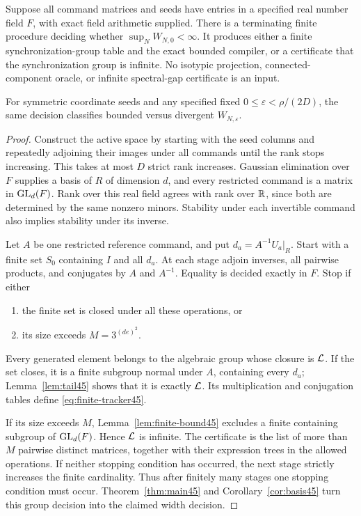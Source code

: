 \begin{theorem}\label{thm:decision45}
Suppose all command matrices and seeds have entries in a specified real number field $F$, with exact field arithmetic supplied. There is a terminating finite procedure deciding whether $\sup_NW_{N,0}<\infty$. It produces either a finite synchronization-group table and the exact bounded compiler, or a certificate that the synchronization group is infinite. No isotypic projection, connected-component oracle, or infinite spectral-gap certificate is an input.

For symmetric coordinate seeds and any specified fixed
$0\le\varepsilon<\rho/(2D)$, the same decision classifies bounded versus divergent $W_{N,\varepsilon}$.
\end{theorem}
\begin{proof}
Construct the active space by starting with the seed columns and repeatedly adjoining their images under all commands until the rank stops increasing. This takes at most $D$ strict rank increases. Gaussian elimination over $F$ supplies a basis of $R$ of dimension $d$, and every restricted command is a matrix in $\operatorname{GL}_d(F)$. Rank over this real field agrees with rank over $\mathbb R$, since both are determined by the same nonzero minors. Stability under each invertible command also implies stability under its inverse.

Let $A$ be one restricted reference command, and put $d_a=A^{-1}U_a|_R$. Start with a finite set $S_0$ containing $I$ and all $d_a$. At each stage adjoin inverses, all pairwise products, and conjugates by $A$ and $A^{-1}$. Equality is decided exactly in $F$. Stop if either
\begin{enumerate}
\item the finite set is closed under all these operations, or
\item its size exceeds $M=3^{(de)^2}$.
\end{enumerate}
Every generated element belongs to the algebraic group whose closure is $\mathcal L$. If the set closes, it is a finite subgroup normal under $A$, containing every $d_a$; Lemma~\ref{lem:tail45} shows that it is exactly $\mathcal L$. Its multiplication and conjugation tables define \eqref{eq:finite-tracker45}.

If its size exceeds $M$, Lemma~\ref{lem:finite-bound45} excludes a finite containing subgroup of $\operatorname{GL}_d(F)$. Hence $\mathcal L$ is infinite. The certificate is the list of more than $M$ pairwise distinct matrices, together with their expression trees in the allowed operations. If neither stopping condition has occurred, the next stage strictly increases the finite cardinality. Thus after finitely many stages one stopping condition must occur. Theorem~\ref{thm:main45} and Corollary~\ref{cor:basis45} turn this group decision into the claimed width decision.
\end{proof}

